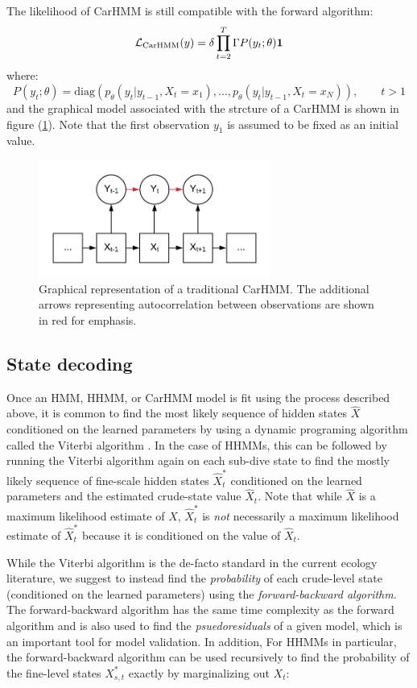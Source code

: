 The likelihood of CarHMM is still compatible with the forward algorithm:
\begin{equation}
\mathcal{L}_{\text{CarHMM}}(y) = \delta \prod_{t=2}^T \Gamma P(y_t;\theta) \mathbf{1}
\label{CarHMM_likelihood}
\end{equation}
where:
%
$$P(y_t;\theta) = \text{diag}(p_\theta(y_t|y_{t-1},X_t = x_1), . . . , p_\theta(y_t|y_{t-1},X_t = x_N )), \qquad t > 1$$
%
and the graphical model associated with the strcture of a CarHMM is shown in figure (\ref{fig:CarHMM}). Note that the first observation $y_1$ is assumed to be fixed as an initial value.

\begin{figure}[h!]
	\centering
	\includegraphics[width=3in]{../../Plots/CarHMM.png}
	\caption{Graphical representation of a traditional CarHMM. The additional arrows representing autocorrelation between observations are shown in red for emphasis.}
	\label{fig:CarHMM}
\end{figure}



\subsection{State decoding}

Once an HMM, HHMM, or CarHMM model is fit using the process described above, it is common to find the most likely sequence of hidden states $\hat X$ conditioned on the learned parameters by using a dynamic programing algorithm called the Viterbi algorithm \cite{Viterbi:1967}. In the case of HHMMs, this can be followed by running the Viterbi algorithm again on each sub-dive state to find the mostly likely sequence of fine-scale hidden states $\hat X_t^*$ conditioned on the learned parameters and the estimated crude-state value $\hat X_t$. Note that while $\hat X$ is a maximum likelihood estimate of $X$, $\hat X^*_t$ is \textit{not} necessarily a maximum likelihood estimate of $\hat X^*_t$ because it is conditioned on the value of $\hat X_t$.

While the Viterbi algorithm is the de-facto standard in the current ecology literature, we suggest to instead find the \textit{probability} of each crude-level state (conditioned on the learned parameters) using the \textit{forward-backward algorithm}. The forward-backward algorithm has the same time complexity as the forward algorithm and is also used to find the \textit{psuedoresiduals} of a given model, which is an important tool for model validation. In addition, For HHMMs in particular, the forward-backward algorithm can be used recursively to find the probability of the fine-level states $X^*_{s,t}$ exactly by marginalizing out $X_t$:

